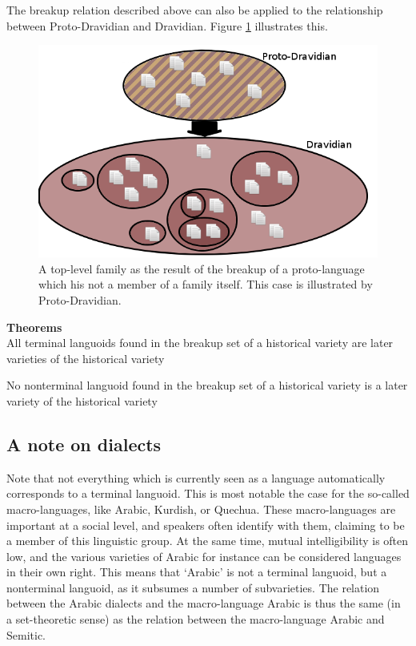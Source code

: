 \documentclass[a4paper,10pt]{article}
\begin{document}
The breakup relation described above can also be applied to the relationship between Proto-Dravidian and Dravidian. Figure \ref{fig:protodravidian} illustrates this. 

\begin{figure}
 \includegraphics[height=.3\textheight]{protodravidian.png}
\caption{A top-level family as the result of the breakup of  a proto-language which his not a  member of a family itself. This case is illustrated by Proto-Dravidian.}
\label{fig:protodravidian}
\end{figure}



\textbf{Theorems}\\
\ea All terminal languoids found in the breakup set of a historical variety are later varieties of the historical variety\z

\ea No nonterminal languoid found in the breakup set of a historical variety is  a later variety of the historical variety\z


\subsection{A note on dialects}
Note that not everything which is currently seen as a language automatically corresponds to a terminal languoid. This is most notable the case for the so-called macro-languages, like Arabic, Kurdish, or Quechua. These macro-languages are important at a social level, and speakers often identify with them, claiming to be a member of this linguistic group. At the same time, mutual intelligibility is often low, and the various varieties of Arabic for instance can be considered languages in their own right. This means that `Arabic' is not a terminal languoid, but a nonterminal languoid, as it subsumes a number of subvarieties. The relation between the Arabic dialects and the macro-language Arabic is thus the same (in a set-theoretic sense) as the relation between the macro-language Arabic and Semitic.
\end{document}
